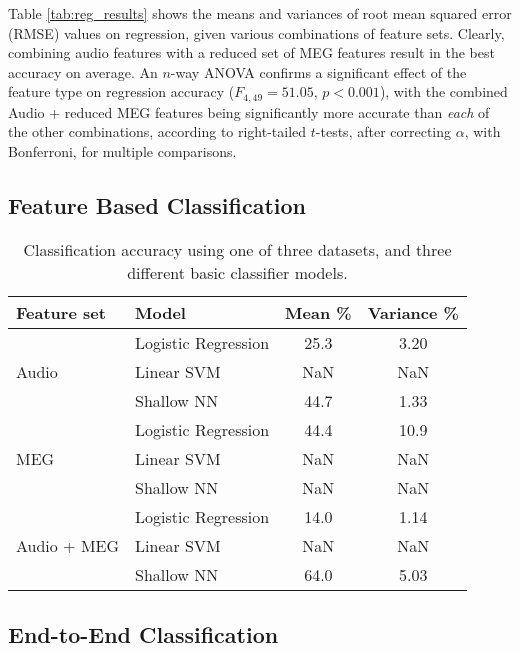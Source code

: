 \documentclass[utf8]{frontiersSCNS} %
\begin{document}
Table \ref{tab:reg_results} shows the means and variances of root mean squared error (RMSE) values on regression, given various combinations of feature sets. Clearly, combining audio features with a reduced set of MEG features result in the best accuracy on average. An $n$-way ANOVA confirms a significant effect of the feature type on regression accuracy ($F_{4,49} = 51.05$, $p<0.001$), with the combined Audio + reduced MEG features being significantly more accurate than {\em each} of the other combinations, according to right-tailed $t$-tests, after correcting $\alpha$, with Bonferroni, for multiple comparisons.

\subsection{Feature Based Classification}

\begin{table}[t]
  \centering
  \label{tab:feat_results}
  \begin{tabular}{l l | c | c}
    \textbf{Feature set} & Model & \textbf{Mean \%} & \textbf{Variance \%} \\
    \toprule
    \multirow{3}{*}{Audio}
    & Logistic Regression & 25.3 & 3.20  \\
    & Linear SVM          & NaN & NaN  \\
    & Shallow NN          & 44.7 & 1.33  \\
    \midrule
    \multirow{3}{*}{MEG}
    & Logistic Regression & 44.4 & 10.9  \\
    & Linear SVM          & NaN & NaN  \\
    & Shallow NN          & NaN & NaN  \\
    \midrule
    \multirow{3}{*}{Audio + MEG}
    & Logistic Regression & 14.0 & 1.14  \\
    & Linear SVM          & NaN & NaN  \\
    & Shallow NN          & 64.0 & 5.03  \\
    \bottomrule
  \end{tabular}
  \caption{Classification accuracy using one of three datasets, and three different basic classifier models.}
\end{table}
  

\subsection{End-to-End Classification}
\end{document}
